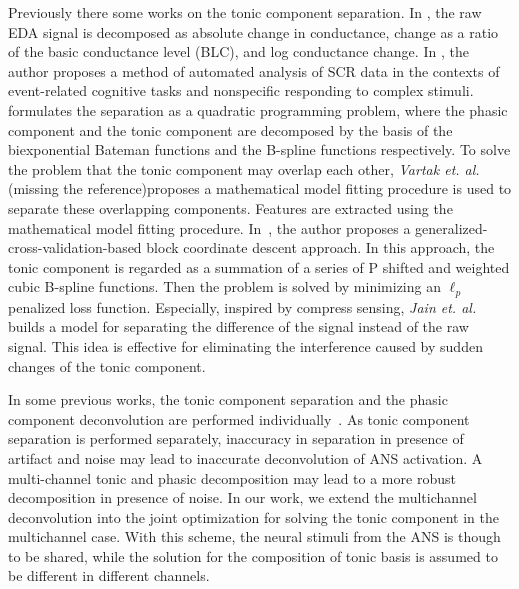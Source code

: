 \documentclass[10pt,conference]{ieeeconf}
\begin{document}
Previously there some works on the tonic component separation. In \cite{van1967skin}, the raw EDA signal is decomposed as absolute change in conductance, change as a ratio of the basic conductance level (BLC), and log conductance change. In \cite{green2014development}, the author proposes a method of automated analysis of SCR data in the contexts of event-related cognitive tasks and nonspecific responding to complex stimuli. \cite{greco2014electrodermal} formulates the separation as a quadratic programming problem, where the phasic component and the tonic component are decomposed by the basis of the biexponential Bateman functions and the B-spline functions respectively. To solve the problem that the tonic component may overlap each other, \textit{Vartak et. al.} {\color{red}(missing the reference)}proposes a mathematical model fitting procedure is used to separate these overlapping components. Features are extracted using the mathematical model fitting procedure. In~\cite{amin2019tonic}, the author proposes a generalized-cross-validation-based block coordinate descent approach. In this approach, the tonic component is regarded as a summation of a series of P shifted and weighted cubic B-spline functions. Then the problem is solved by minimizing an $\ell_p$ penalized loss function. Especially, inspired by compress sensing, \textit{Jain et. al.}~\cite{jain2016compressed} builds a model for separating the difference of the signal instead of the raw signal. This idea is effective for eliminating the interference caused by sudden changes of the tonic component.

In some previous works, the tonic component separation and the phasic component deconvolution are performed individually~\cite{greco2014electrodermal,amin2019robust}. As tonic component separation is performed separately, inaccuracy in separation in presence of artifact and noise may lead to inaccurate deconvolution of ANS activation. A multi-channel tonic and phasic decomposition may lead to a more robust decomposition in presence of noise. In our work, we extend the multichannel deconvolution into the joint optimization for solving the tonic component in the multichannel case. With this scheme, the neural stimuli from the ANS is though to be shared, while the solution for the composition of tonic basis is assumed to be different in different channels.



\end{document}
